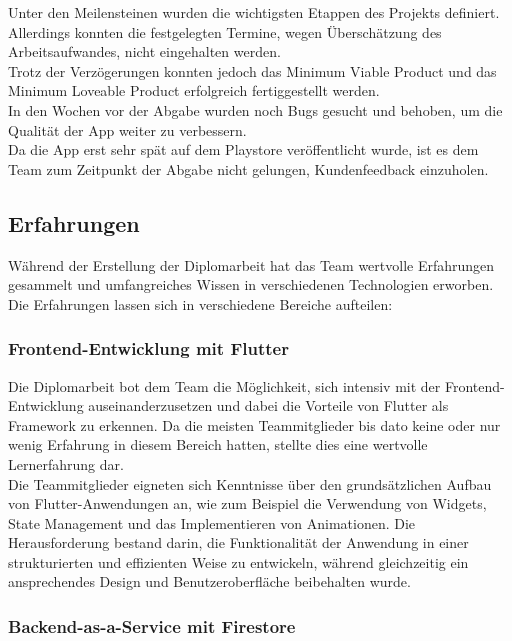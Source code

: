 Unter den Meilensteinen wurden die wichtigsten Etappen des Projekts definiert. Allerdings konnten die festgelegten Termine, wegen Überschätzung des Arbeitsaufwandes, nicht eingehalten werden.
\\
Trotz der Verzögerungen konnten jedoch das Minimum Viable Product und das Minimum Loveable Product erfolgreich fertiggestellt werden.
\\
In den Wochen vor der Abgabe wurden noch Bugs gesucht und behoben, um die Qualität der App weiter zu verbessern.
\\
Da die App erst sehr spät auf dem Playstore veröffentlicht wurde, ist es dem Team zum Zeitpunkt der Abgabe nicht gelungen, Kundenfeedback einzuholen.


\subsection{Erfahrungen}

Während der Erstellung der Diplomarbeit hat das Team wertvolle Erfahrungen gesammelt und umfangreiches Wissen in verschiedenen Technologien erworben. Die Erfahrungen lassen sich in verschiedene Bereiche aufteilen:

\subsubsection{Frontend-Entwicklung mit Flutter}

Die Diplomarbeit bot dem Team die Möglichkeit, sich intensiv mit der Frontend-Entwicklung auseinanderzusetzen und dabei die Vorteile von Flutter als Framework zu erkennen. Da die meisten Teammitglieder bis dato keine oder nur wenig Erfahrung in diesem Bereich hatten, stellte dies eine wertvolle Lernerfahrung dar.
\\
Die Teammitglieder eigneten sich Kenntnisse über den grundsätzlichen Aufbau von Flutter-Anwendungen an, wie zum Beispiel die Verwendung von Widgets, State Management und das Implementieren von Animationen. Die Herausforderung bestand darin, die Funktionalität der Anwendung in einer strukturierten und effizienten Weise zu entwickeln, während gleichzeitig ein ansprechendes Design und Benutzeroberfläche beibehalten wurde.

\subsubsection{Backend-as-a-Service mit Firestore}

